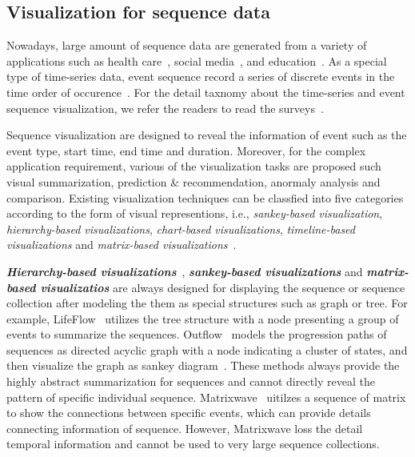 \subsection{Visualization for sequence data}
Nowadays, large amount of sequence data are generated from a variety of applications such as health care~\cite{malik2015cohort, wongsuphasawat2011outflow}, social media~\cite{zhao2014fluxflow, law2018maqui}, and education~\cite{chen2015peakvizor, mu2019moocad, goulden2019ccvis, he2019vuc, chen2018viseq}.
As a special type of time-series data, event sequence record a series of discrete events in the time order of occurence~\cite{guo2020survey}. For the detail taxnomy about the time-series and event sequence visualization, we refer the readers to read the surveys~\cite{guo2020survey, silva2000visualization}. 

Sequence visualization are designed to reveal the information of event such as the event type, start time, end time and duration. Moreover, for the complex application requirement, various of the visualization tasks are proposed such visual summarization, prediction $\&$ recommendation, anormaly analysis and comparison. Existing visualization techniques can be classfied into five categories according to the form of visual representions, i.e., \emph{sankey-based visualization}, \emph{hierarchy-based visualizations}, \emph{chart-based visualizations}, \emph{timeline-based visualizations} and \emph{matrix-based visualizations}~\cite{guo2020survey}. 

\emph{\textbf{Hierarchy-based visualizations}}~\cite{gotz2019visual}, \emph{\textbf{sankey-based visualizations}} and \emph{\textbf{matrix-based visualizatios}} are always designed for displaying the sequence or sequence collection after modeling the them as special structures such as graph or tree.
For example, LifeFlow~\cite{wongsuphasawat2011lifeflow} utilizes the tree structure with a node presenting a group of events to summarize the sequences. Outflow~\cite{wongsuphasawat2011outflow} models the progression paths of sequences as directed acyclic graph with a node indicating a cluster of states, and then visualize the graph as sankey diagram~\cite{riehmann2005interactive}.  These methods always provide the highly abstract summarization for sequences and cannot directly reveal the pattern of specific individual sequence. Matrixwave~\cite{zhao2015matrixwave} uitilzes a sequence of matrix to show the connections between specific events, which can provide details connecting information of sequence. However, Matrixwave loss the detail temporal information and cannot be used to very large sequence collections. 

